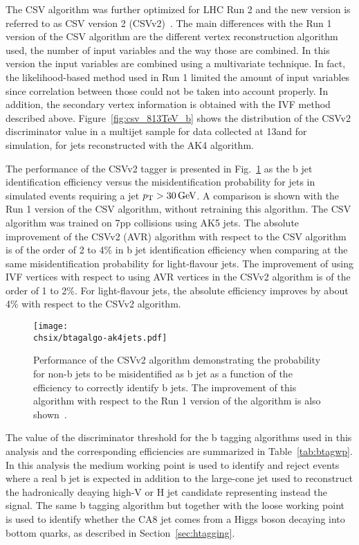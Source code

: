 The CSV algorithm was further optimized for LHC Run 2 and the new version is referred to as CSV version 2 (CSVv2)~\cite{CMS-PAS-BTV-15-001}. The main differences with the Run 1 version of the CSV algorithm are the different vertex reconstruction algorithm used, the number of input variables and the way those are combined. In this version the input variables are combined using a multivariate technique. In fact, the likelihood-based method used in Run 1 limited the amount of input variables since correlation between those could not be taken into account properly. In addition, the secondary vertex information is obtained with the IVF method described above. Figure~\ref{fig:csv_813TeV_b} shows the distribution of the CSVv2 discriminator value in a multijet sample for data collected at 13\TeV and for simulation, for jets reconstructed with the AK4 algorithm.

The performance of the CSVv2 tagger is presented in Fig.~\ref{fig:btagalgo} as the b jet identification efficiency versus the misidentification probability for jets in simulated \ttbar events requiring a jet $p_{\mathrm{T}} > 30\,\text{Ge\hspace{-.08em}V}$. A comparison is shown with the Run 1 version of the CSV algorithm, without retraining this algorithm. The CSV algorithm was trained on 7\TeV pp collisions using AK5 jets. The absolute improvement of the CSVv2 (AVR) algorithm with respect to the CSV algorithm is of the order of 2 to 4\% in b jet identification efficiency when comparing at the same misidentification probability for light-flavour jets. The improvement of using IVF vertices with respect to using AVR vertices in the CSVv2 algorithm is of the order of 1 to 2\%. For light-flavour jets, the absolute efficiency improves by about 4\% with respect to the CSVv2 algorithm.

\begin{figure}[!htb]
 \begin{center}
  \texttt{[image: \\chsix/btagalgo-ak4jets.pdf]}
 \end{center}
 \caption{Performance of the CSVv2 algorithm demonstrating the probability for non-b jets to be misidentified as b jet as a function of the efficiency to correctly identify b jets. The improvement of this algorithm with respect to the Run 1 version of the algorithm is also shown~\cite{CMS-PAS-BTV-15-001}.}
 \label{fig:btagalgo}
\end{figure}

The value of the discriminator threshold for the b tagging algorithms used in this analysis and the corresponding efficiencies are summarized in Table~\ref{tab:btagwp}. 
In this analysis the medium working point is used to identify and reject \ttbar events where a real b jet is expected in addition to the large-cone jet used to reconstruct the hadronically deaying high-\pt V or H jet candidate representing instead the signal. The same b tagging algorithm but together with the loose working point is used to identify whether the CA8 jet comes from a Higgs boson decaying into bottom quarks, as described in Section~\ref{sec:htagging}.

